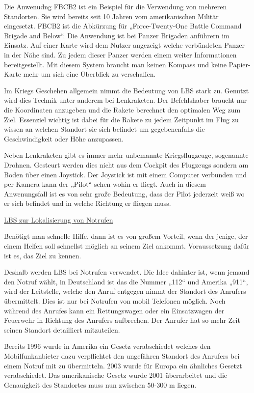 Die Anwenudng FBCB2 ist ein Beispiel für die Verwendung von mehreren Standorten. Sie wird bereits seit 10 Jahren vom amerikanischen Militär eingesetzt. FBCB2 ist die Abkürzung für „Force-Twenty-One Battle Command Brigade and Below“. Die Anwendung ist bei Panzer Brigaden anführern im Einsatz. Auf einer Karte wird dem Nutzer angezeigt welche verbündeten Panzer in der Nähe sind. Zu jedem dieser Panzer werden einem weiter Informationen bereitgestellt. Mit diesem System braucht man keinen Kompass und keine Papier- Karte mehr um sich eine Überblick zu verschaffen. 

Im Kriegs Geschehen allgemein nimmt die Bedeutung von LBS stark zu. Genutzt wird dies Technik unter anderem bei Lenkraketen. Der Befehlshaber braucht nur die Koordinaten anzugeben und die Rakete berechnet den optimalen Weg zum Ziel. Essenziel wichtig ist dabei für die Rakete zu jedem Zeitpunkt im Flug zu wissen an welchen Standort sie sich befindet um gegebenenfalls die Geschwindigkeit oder Höhe anzupassen. 

Neben Lenkraketen gibt es immer mehr unbemannte Kriegsflugzeuge, sogenannte Drohnen. Gesteurt werden dies nicht aus dem Cockpit des Flugzeugs sondern am Boden über einen Joystick. Der Joystick ist mit einem Computer verbunden und per Kamera kann der „Pilot“ sehen wohin er fliegt. Auch in diesem Anwenungsfall ist es von sehr große Bedeutung, dass der Pilot jederzeit weiß wo er sich befindet und in welche Richtung er fliegen muss.

\underline{LBS zur Lokalisierung von Notrufen}

Benötigt man schnelle Hilfe, dann ist es von großem Vorteil, wenn der jenige, der einem Helfen soll schnellst möglich an seinem Ziel ankommt. Voraussetzung dafür ist es, das Ziel zu kennen.

Deshalb werden LBS bei Notrufen verwendet. Die Idee dahinter ist, wenn jemand den Notruf wählt, in Deutschland ist das die Nummer „112“ und Amerika „911“, wird der Leitstelle, welche den Anruf entgegen nimmt der Standort des Anrufers übermittelt. Dies ist nur bei Notrufen von mobil Telefonen möglich. Noch während des Anrufes kann ein Rettungswagen oder ein Einsatzwagen der Feuerwehr in Richtung des Anrufers aufbrechen. Der Anrufer hat so mehr Zeit seinen Standort detailliert mitzuteilen.

Bereits 1996 wurde in Amerika ein Gesetz verabschiedet welches den Mobilfunkanbieter dazu verpflichtet den ungefähren Standort des Anrufers bei einem Notruf mit zu übermitteln.  2003 wurde für Europa ein ähnliches Gesetzt verabschiedet. Das amerikanische Gesetz wurde 2001 überarbeitet und die Genauigkeit des Standortes muss nun zwischen 50-300 m liegen.  


